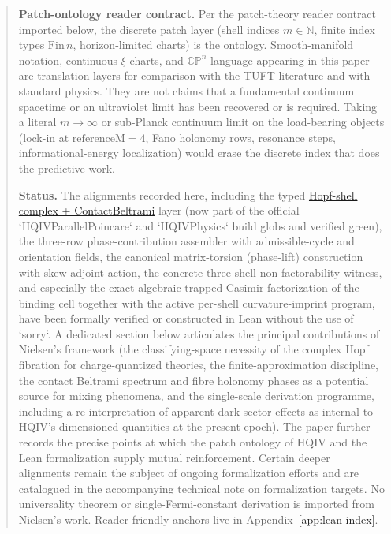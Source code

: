 \documentclass[11pt]{article}
\begin{document}
\begin{abstract}
\noindent\textbf{Patch-ontology reader contract.}
Per the patch-theory reader contract imported below, the discrete patch
layer (shell indices $m\in\mathbb{N}$, finite index types $\mathrm{Fin}\,n$,
horizon-limited charts) is the ontology. Smooth-manifold notation,
continuous $\xi$ charts, and $\mathbb{CP}^n$ language appearing in this
paper are translation layers for comparison with the TUFT literature and
with standard physics. They are not claims that a fundamental continuum
spacetime or an ultraviolet limit has been recovered or is required.
Taking a literal $m\to\infty$ or sub-Planck continuum limit on the load-bearing
objects (lock-in at $\mathrm{referenceM}=4$, Fano holonomy rows, resonance
steps, informational-energy localization) would erase the discrete index
that does the predictive work.

\noindent\textbf{Status.}
The alignments recorded here, including the typed
\hyperref[lean:hopf-shell-complex]{Hopf-shell complex + ContactBeltrami}
layer (now part of the official `HQIVParallelPoincare` and `HQIVPhysics`
build globs and verified green), the three-row phase-contribution assembler with
admissible-cycle and orientation fields, the canonical matrix-torsion (phase-lift)
construction with skew-adjoint action, the concrete three-shell non-factorability witness, and
especially the exact algebraic trapped-Casimir factorization of the
binding cell together with the active per-shell curvature-imprint program,
have been formally verified or constructed in Lean without the use of
`sorry`. A dedicated section below articulates the principal contributions of
Nielsen's framework (the classifying-space necessity of the complex Hopf
fibration for charge-quantized theories, the finite-approximation
discipline, the contact Beltrami spectrum and fibre holonomy phases as a
potential source for mixing phenomena, and the single-scale derivation
programme, including a re-interpretation of apparent dark-sector effects
as internal to HQIV's dimensioned quantities at the present epoch). The
paper further records the precise points at which the patch ontology of
HQIV and the Lean formalization supply mutual reinforcement. Certain
deeper alignments remain the subject of ongoing formalization efforts and
are catalogued in the accompanying technical note on formalization
targets. No universality theorem or single-Fermi-constant derivation is
imported from Nielsen's work.
Reader-friendly anchors live in Appendix~\ref{app:lean-index}.
\end{abstract}


\end{document}
